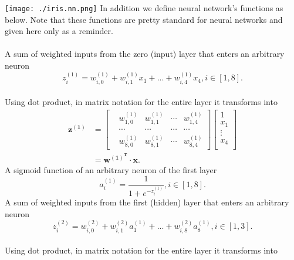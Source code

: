 \documentclass[12pt,titlepage]{article}
\begin{document}
\texttt{[image: ./iris.nn.png]}
\newpage
In addition we define neural network's functions as below. Note that these functions are pretty standard for neural networks and given here only as a reminder. \\\\
A sum of weighted inputs from the zero (input) layer that enters an arbitrary neuron
	\begin{equation*} z_{i}^{(1)}=w_{i,0}^{(1)}+w_{i,1}^{(1)}x_{1}+...+w_{i,4}^{(1)}x_{4}, i \in [1,8].\end{equation*} 
     \\Using dot product, in matrix notation for the entire layer it transforms into  
      \begin{equation*}
       \begin{split} 
           \mathbf{z^{(1)}}&=\begin{bmatrix}
           &w_{1,0}^{(1)} &w_{1,1}^{(1)} &\cdots &w_{1,4}^{(1)} \\ 
           &\cdots &\cdots &\cdots &\cdots\\ 
           &w_{8,0}^{(1)} &w_{8,1}^{(1)} &\cdots &w_{8,4}^{(1)} 
       \end{bmatrix}
       \begin{bmatrix}
          1\\ 
          x_{1}\\ 
          \vdots \\ 
          x_{4}\\ 
       \end{bmatrix} \\
       &=\mathbf{w^{(1)^{T}}}\cdot \mathbf{x}.
       \end{split}
       \end{equation*}
A sigmoid function of an arbitrary neuron of the first layer
    \begin{equation*} a_{i}^{(1)}=\frac{1}{1+e^{-z_{i}^{(1)}}}, i \in [1,8]. \end{equation*}
A sum of weighted inputs from the first (hidden) layer that enters an arbitrary neuron
    \begin{equation*} z_{i}^{(2)}=w_{i,0}^{(2)}+w_{i,1}^{(2)}a_{1}^{(1)}+...+w_{i,8}^{(2)}a_{8}^{(1)}, i \in [1,3]. \end{equation*}
     \\Using dot product, in matrix notation for the entire layer it transforms into  
\end{document}
